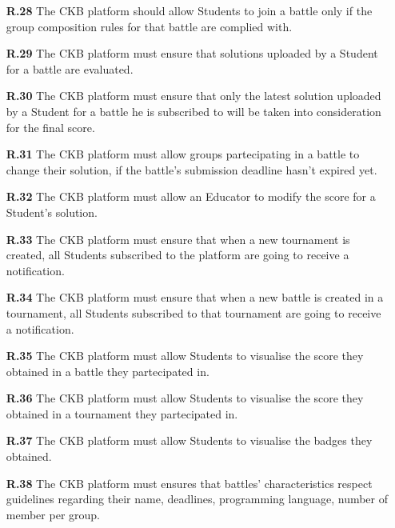 \documentclass{article}
\begin{document}
{\begin{itemize}
          other Students in order to form groups.
    \item[\textbf{R.28}] The CKB platform should allow Students to join a battle only if the group composition rules
          for that battle are complied with.
    \item[\textbf{R.29}] The CKB platform must ensure that solutions uploaded by a Student for a battle are evaluated.
    \item[\textbf{R.30}] The CKB platform must ensure that only the latest solution uploaded by a Student for a battle he is subscribed to will
          be taken into consideration for the final score.
    \item[\textbf{R.31}] The CKB platform must allow groups partecipating in a battle to change their solution,
          if the battle's submission deadline hasn't expired yet.
    \item[\textbf{R.32}] The CKB platform must allow an Educator to modify the score for a Student's solution.
    \item[\textbf{R.33}] The CKB platform must ensure that when a new tournament is created, all
          Students subscribed to the platform are going to receive a notification.
    \item[\textbf{R.34}] The CKB platform must ensure that when a new battle is created in a tournament,
          all Students subscribed to that tournament are going to receive a notification.
    \item[\textbf{R.35}] The CKB platform must allow Students to visualise the score they obtained in a battle they partecipated in.
    \item[\textbf{R.36}] The CKB platform must allow Students to visualise the score they obtained in a tournament they partecipated in.
    \item[\textbf{R.37}] The CKB platform must allow Students to visualise the badges they obtained.
    \item[\textbf{R.38}] The CKB platform must ensures that battles' characteristics respect guidelines
          regarding their name, deadlines, programming language, number of member per group.
\end{itemize}

\newpage

}
\end{document}
